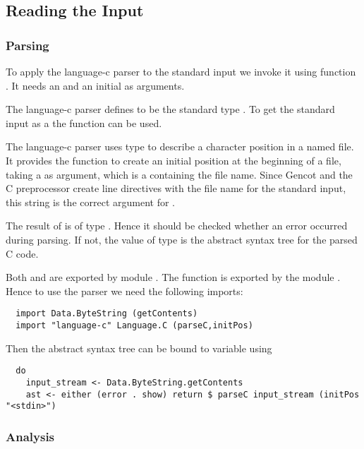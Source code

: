 \subsection{Reading the Input}
\label{impl-ccode-read}

\subsubsection{Parsing}

To apply the language-c parser to the standard input we invoke it using function . It needs an 
and an initial  as arguments. 

The language-c parser defines  to be the standard type . To get the 
standard input as a  the function  can be used. 

The language-c parser uses type  to describe a character position in a named file. It provides
the function  to create an initial position at the beginning of a file, taking a 
as argument, which is a  containing the file name. Since Gencot and the C preprocessor create
line directives with the file name  for the standard input, this string is the correct argument
for . 

The result of  is of type . Hence it should be checked whether
an error occurred during parsing. If not, the value of type  is the abstract syntax tree for
the parsed C code.

Both  and  are exported by module . The function 
is exported by the module . Hence to use the parser we need the following imports:
\begin{verbatim}
  import Data.ByteString (getContents)
  import "language-c" Language.C (parseC,initPos)
\end{verbatim}

Then the abstract syntax tree can be bound to variable  using
\begin{verbatim}
  do
    input_stream <- Data.ByteString.getContents
    ast <- either (error . show) return $ parseC input_stream (initPos "<stdin>")
\end{verbatim}

\subsubsection{Analysis}

